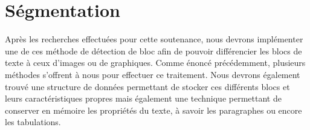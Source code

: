 \documentclass[]{report}
\begin{document}

    \section{S\'egmentation} %
    \label{sec:s\'egmentation}
  		Après les recherches effectuées pour cette soutenance, nous devrons implémenter une de ces méthode de détection de bloc afin de pouvoir différencier les blocs de texte à ceux d'images ou de graphiques. Comme énoncé précédemment, plusieurs méthodes s'offrent à nous pour effectuer ce traitement. Nous devrons également trouvé une structure de données permettant de stocker ces différents blocs et leurs caractéristiques propres mais également une technique permettant de conserver en mémoire les propriétés du texte, à savoir les paragraphes ou encore les tabulations.







 
\end{document}
